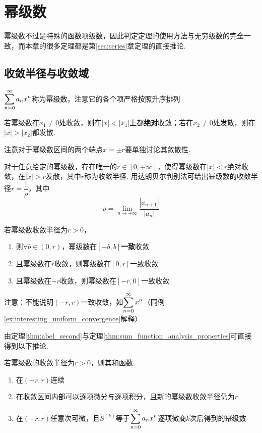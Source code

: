 
\section{幂级数}
幂级数不过是特殊的函数项级数，因此判定定理的使用方法与无穷级数的完全一致，而本章的很多定理都是第\ref{sec:series}章定理的直接推论.
\subsection{收敛半径与收敛域}
\begin{definition}[幂级数]
$\displaystyle\sum_{n=0}^{\infty}a_nx^n$称为幂级数，注意它的各个项严格按照升序排列
\end{definition}
\begin{theorem}
若幂级数在$x_1\neq 0$处收敛，则在$|x|<|x_1|$上都\textbf{绝对}收敛；若在$x_2\neq 0$处发散，则在$|x|>|x_2|$都发散.
\end{theorem}
\par 注意对于幂级数区间的两个端点$x=\pm r$要单独讨论其敛散性.
\begin{definition}
对于任意给定的幂级数，存在唯一的$r\in[0,+\infty]$，使得幂级数在$|x|<r$绝对收敛，在$|x|>r$发散，其中$r$称为收敛半径. 用达朗贝尔判别法可给出幂级数的收敛半径$r=\dfrac{1}{\rho}$，其中
\[\rho=\lim_{n\to+\infty}\dfrac{|a_{n+1}|}{|a_n|}\]
\end{definition}
\begin{theorem}[阿贝尔第二定理]
\label{thm:abel_second}
若幂级数收敛半径为$r>0$，
\begin{enumerate}
	\itemsep -3pt
	\item 则$\forall b\in(0,r)$，幂级数在$[-b,b]$\textbf{一致}收敛
	\item 且幂级数在$r$收敛，则幂级数在$[0,r]$一致收敛
	\item 且幂级数在$-r$收敛，则幂级数在$[-r,0]$一致收敛
\end{enumerate}
注意：不能说明$(-r,r)$一致收敛，如$\displaystyle\sum_{n=0}^{\infty}x^n$（同例\ref{ex:interesting_uniform_convergence}解释）
\end{theorem}
\par 由定理\ref{thm:abel_second}与定理\ref{thm:sum_function_analysis_properties}可直接得到以下推论.
\begin{corollary2}[幂级数和函数的分析性质]
若幂级数的收敛半径为$r>0$，则其和函数
\begin{enumerate}
	\itemsep -3pt
	\item 在$(-r,r)$连续
	\item 在收敛区间内部可以逐项微分与逐项积分，且新的幂级数收敛半径仍为$r$
	\item 在$(-r,r)$任意次可微，且$S^{(k)}$等于$\displaystyle\sum_{n=0}^{\infty}a_nx^n$逐项微商$k$次后得到的幂级数
\end{enumerate}
\end{corollary2}
